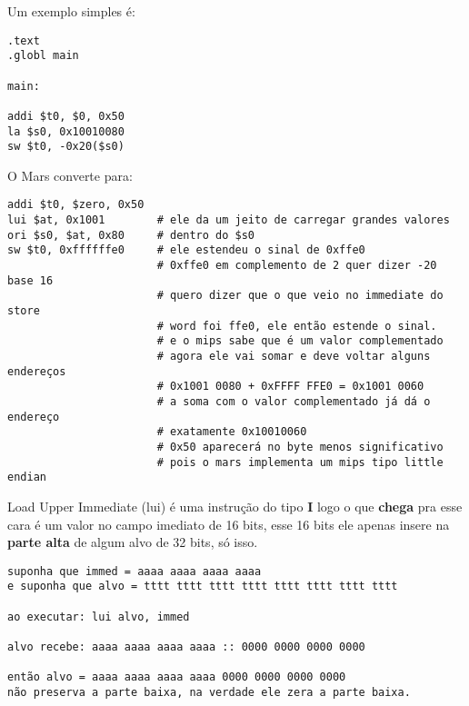 \documentclass{article}
\begin{document}
Um exemplo simples é:

\begin{verbatim}
.text
.globl main

main:

addi $t0, $0, 0x50
la $s0, 0x10010080
sw $t0, -0x20($s0)
\end{verbatim}

O Mars converte para:

\begin{verbatim}
addi $t0, $zero, 0x50
lui $at, 0x1001        # ele da um jeito de carregar grandes valores
ori $s0, $at, 0x80     # dentro do $s0
sw $t0, 0xffffffe0     # ele estendeu o sinal de 0xffe0
                       # 0xffe0 em complemento de 2 quer dizer -20 base 16
                       # quero dizer que o que veio no immediate do store
                       # word foi ffe0, ele então estende o sinal.
                       # e o mips sabe que é um valor complementado
                       # agora ele vai somar e deve voltar alguns endereços
                       # 0x1001 0080 + 0xFFFF FFE0 = 0x1001 0060
                       # a soma com o valor complementado já dá o endereço
                       # exatamente 0x10010060
                       # 0x50 aparecerá no byte menos significativo
                       # pois o mars implementa um mips tipo little endian
\end{verbatim}

Load Upper Immediate (lui) é uma instrução do tipo \textbf{I} logo o que
\textbf{chega} pra esse cara é um valor no campo imediato de 16 bits, esse 16
bits ele apenas insere na \textbf{parte alta} de algum alvo de 32 bits, só isso.

\begin{verbatim}
suponha que immed = aaaa aaaa aaaa aaaa
e suponha que alvo = tttt tttt tttt tttt tttt tttt tttt tttt

ao executar: lui alvo, immed

alvo recebe: aaaa aaaa aaaa aaaa :: 0000 0000 0000 0000

então alvo = aaaa aaaa aaaa aaaa 0000 0000 0000 0000
não preserva a parte baixa, na verdade ele zera a parte baixa.
\end{verbatim}
\end{document}
